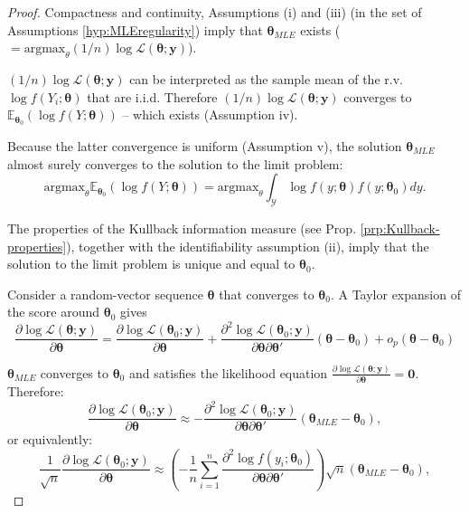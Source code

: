 \documentclass[
  11pt,
]{book}
\theoremstyle{definition}
\theoremstyle{definition}
\theoremstyle{definition}
\theoremstyle{definition}
\theoremstyle{remark}
\begin{document}
\begin{proof}
Compactness and continuity, Assumptions (i) and (iii) (in the set of Assumptions \ref{hyp:MLEregularity}) imply that \(\boldsymbol\theta_{MLE}\) exists (\(=\mbox{argmax}_\theta (1/n)\log \mathcal{L}(\boldsymbol\theta;\mathbf{y})\)).

\((1/n)\log \mathcal{L}(\boldsymbol\theta;\mathbf{y})\) can be interpreted as the sample mean of the r.v. \(\log f(Y_i;\boldsymbol\theta)\) that are i.i.d. Therefore \((1/n)\log \mathcal{L}(\boldsymbol\theta;\mathbf{y})\) converges to \(\mathbb{E}_{\boldsymbol\theta_0}(\log f(Y;\boldsymbol\theta))\) -- which exists (Assumption iv).

Because the latter convergence is uniform (Assumption v), the solution \(\boldsymbol\theta_{MLE}\) almost surely converges to the solution to the limit problem:
\[
\mbox{argmax}_\theta \mathbb{E}_{\boldsymbol\theta_0}(\log f(Y;\boldsymbol\theta)) = \mbox{argmax}_\theta \int_{\mathcal{Y}} \log f(y;\boldsymbol\theta)f(y;\boldsymbol\theta_0) dy.
\]

The properties of the Kullback information measure (see Prop. \ref{prp:Kullback-properties}), together with the identifiability assumption (ii), imply that the solution to the limit problem is unique and equal to \(\boldsymbol\theta_0\).

Consider a random-vector sequence \(\boldsymbol\theta\) that converges to \(\boldsymbol\theta_0\). A Taylor expansion of the score around \(\boldsymbol\theta_0\) gives
\[
\frac{\partial \log \mathcal{L}(\boldsymbol\theta;\mathbf{y})}{\partial \boldsymbol\theta} = \frac{\partial \log \mathcal{L}(\boldsymbol\theta_0;\mathbf{y})}{\partial \boldsymbol\theta} + \frac{\partial^2 \log \mathcal{L}(\boldsymbol\theta_0;\mathbf{y})}{\partial \boldsymbol\theta \partial \boldsymbol\theta'}(\boldsymbol\theta - \boldsymbol\theta_0) + o_p(\boldsymbol\theta - \boldsymbol\theta_0)
\]

\(\boldsymbol\theta_{MLE}\) converges to \(\boldsymbol\theta_0\) and satisfies the likelihood equation \(\frac{\partial \log \mathcal{L}(\boldsymbol\theta;\mathbf{y})}{\partial \boldsymbol\theta} = \mathbf{0}\). Therefore:
\[
\frac{\partial \log \mathcal{L}(\boldsymbol\theta_0;\mathbf{y})}{\partial \boldsymbol\theta} \approx - \frac{\partial^2 \log \mathcal{L}(\boldsymbol\theta_0;\mathbf{y})}{\partial \boldsymbol\theta \partial \boldsymbol\theta'}(\boldsymbol\theta_{MLE} - \boldsymbol\theta_0),
\]
or equivalently:
\[
\frac{1}{\sqrt{n}} \frac{\partial \log \mathcal{L}(\boldsymbol\theta_0;\mathbf{y})}{\partial \boldsymbol\theta} \approx
\left(- \frac{1}{n} \sum_{i=1}^n \frac{\partial^2 \log f(y_i;\boldsymbol\theta_0)}{\partial \boldsymbol\theta \partial \boldsymbol\theta'} \right)\sqrt{n}(\boldsymbol\theta_{MLE} - \boldsymbol\theta_0),
\]


\end{proof}
\end{document}
